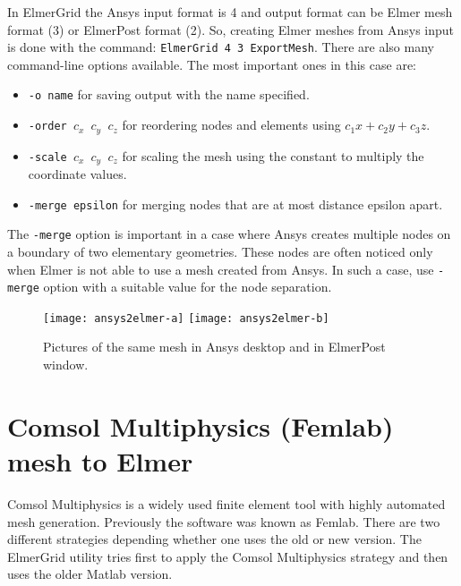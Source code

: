 %
%
In ElmerGrid the Ansys input format is 4 and output
format can be Elmer mesh format (3) or ElmerPost format (2). So,
creating Elmer meshes from Ansys input is done with the command:
\texttt{ElmerGrid 4 3 ExportMesh}. There are also many command-line 
options available. The
most important ones in this case are:
%
\begin{itemize}
  \item \texttt{-o name} for saving output with the name specified.  
  \item \texttt{-order $c_x$ $c_y$ $c_z$} for reordering nodes and elements using $c_1x+c_2y +c_3z$.  
  \item \texttt{-scale $c_x$ $c_y$ $c_z$} for scaling the mesh using the constant to multiply
the coordinate values.
  \item \texttt{-merge epsilon} for merging nodes that are at most distance epsilon apart.
\end{itemize}

The \texttt{-merge} option is important in a case where Ansys creates multiple
nodes on a boundary of two elementary geometries. These nodes are
often noticed only when Elmer is not able to use a mesh created from
Ansys. In such a case, use \texttt{-merge} option with a suitable value 
for the node separation.

\begin{figure}
\begin{center}
\texttt{[image: ansys2elmer-a]}
\hspace{10mm}
\texttt{[image: ansys2elmer-b]}
\end{center}
\caption{Pictures of the same mesh in Ansys desktop and in ElmerPost window.}
\end{figure}


\section{Comsol Multiphysics (Femlab) mesh to Elmer}

Comsol Multiphysics is a widely used finite element tool with highly 
automated mesh generation. Previously the software was known as Femlab. 
There are two different strategies depending whether one uses the old or new
version. 
The ElmerGrid utility tries first to apply the Comsol Multiphysics strategy and then
uses the older Matlab version. 


